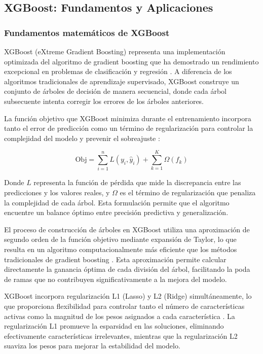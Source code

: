 \subsection{XGBoost: Fundamentos y Aplicaciones}

\subsubsection{Fundamentos matemáticos de XGBoost}
XGBoost (eXtreme Gradient Boosting) representa una implementación optimizada del algoritmo de gradient boosting que ha demostrado un rendimiento excepcional en problemas de clasificación y regresión \cite{chen2016xgboost}. A diferencia de los algoritmos tradicionales de aprendizaje supervisado, XGBoost construye un conjunto de árboles de decisión de manera secuencial, donde cada árbol subsecuente intenta corregir los errores de los árboles anteriores.

La función objetivo que XGBoost minimiza durante el entrenamiento incorpora tanto el error de predicción como un término de regularización para controlar la complejidad del modelo y prevenir el sobreajuste \cite{chen2016xgboost}:

\begin{equation}
\text{Obj} = \sum_{i=1}^{n} L(y_i, \hat{y}_i) + \sum_{k=1}^{K} \Omega(f_k)
\end{equation}

Donde $L$ representa la función de pérdida que mide la discrepancia entre las predicciones y los valores reales, y $\Omega$ es el término de regularización que penaliza la complejidad de cada árbol. Esta formulación permite que el algoritmo encuentre un balance óptimo entre precisión predictiva y generalización.

El proceso de construcción de árboles en XGBoost utiliza una aproximación de segundo orden de la función objetivo mediante expansión de Taylor, lo que resulta en un algoritmo computacionalmente más eficiente que los métodos tradicionales de gradient boosting \cite{friedman2001greedy}. Esta aproximación permite calcular directamente la ganancia óptima de cada división del árbol, facilitando la poda de ramas que no contribuyen significativamente a la mejora del modelo.

XGBoost incorpora regularización L1 (Lasso) y L2 (Ridge) simultáneamente, lo que proporciona flexibilidad para controlar tanto el número de características activas como la magnitud de los pesos asignados a cada característica \cite{friedman2001greedy}. La regularización L1 promueve la esparsidad en las soluciones, eliminando efectivamente características irrelevantes, mientras que la regularización L2 suaviza los pesos para mejorar la estabilidad del modelo.

